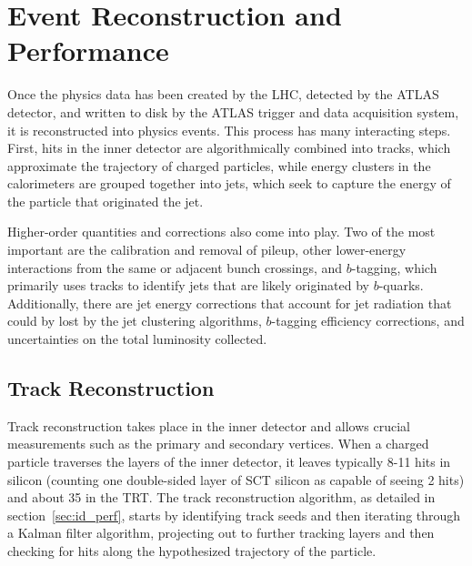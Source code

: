 

\chapter[Reconstruction and Performance]{Event Reconstruction and Performance}
Once the physics data has been created by the LHC, detected by the ATLAS detector, and written to disk by the ATLAS trigger and data acquisition system, it is reconstructed into physics events.  This process has many interacting steps.  First, hits in the inner detector are algorithmically combined into tracks, which approximate the trajectory of charged particles, while energy clusters in the calorimeters are grouped together into jets, which seek to capture the energy of the particle that originated the jet.  

Higher-order quantities and corrections also come into play.  Two of the most important are the calibration and removal of pileup, other lower-energy interactions from the same or adjacent bunch crossings, and $b$-tagging, which primarily uses tracks to identify jets that are likely originated by $b$-quarks.  Additionally, there are jet energy corrections that account for jet radiation that could by lost by the jet clustering algorithms, $b$-tagging efficiency corrections, and uncertainties on the total luminosity collected. 



\section{Track Reconstruction}
\label{sec:trk_reco}
Track reconstruction takes place in the inner detector and allows crucial measurements such as the primary and secondary vertices.  When a charged particle traverses the layers of the inner detector, it leaves typically 8-11 hits in silicon (counting one double-sided layer of SCT silicon as capable of seeing 2 hits) and about 35 in the TRT.  The track reconstruction algorithm, as detailed in section~\ref{sec:id_perf}, starts by identifying track seeds and then iterating through a Kalman filter algorithm, projecting out to further tracking layers and then checking for hits along the hypothesized trajectory of the particle.  

